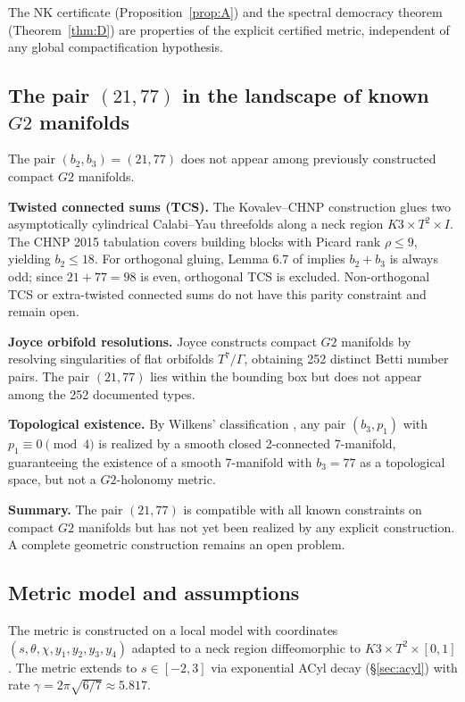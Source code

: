 \documentclass[11pt,a4paper]{article}
\theoremstyle{definition}
\theoremstyle{remark}
\newcommand{\Gtwo}{\mathrm{G}_2}
\def\Gtwo{G2}%
\begin{document}
The NK certificate (Proposition~\ref{prop:A}) and the spectral democracy theorem (Theorem~\ref{thm:D}) are properties of the explicit certified metric, independent of any global compactification hypothesis.

\subsection{The pair $(21, 77)$ in the landscape of known $\Gtwo$ manifolds}

The pair $(b_2, b_3) = (21, 77)$ does not appear among previously constructed compact $\Gtwo$ manifolds.

\textbf{Twisted connected sums (TCS).} The Kovalev--CHNP construction \cite{Kovalev2003,CHNP2015} glues two asymptotically cylindrical Calabi--Yau threefolds along a neck region $K3 \times T^2 \times I$. The CHNP 2015 tabulation covers building blocks with Picard rank $\rho \leq 9$, yielding $b_2 \leq 18$. For orthogonal gluing, Lemma 6.7 of \cite{CHNP2015} implies $b_2 + b_3$ is always odd; since $21 + 77 = 98$ is even, orthogonal TCS is excluded. Non-orthogonal TCS or extra-twisted connected sums \cite{Nordstrom2023} do not have this parity constraint and remain open.

\textbf{Joyce orbifold resolutions.} Joyce \cite{Joyce2000} constructs compact $\Gtwo$ manifolds by resolving singularities of flat orbifolds $T^7/\Gamma$, obtaining 252 distinct Betti number pairs. The pair $(21, 77)$ lies within the bounding box but does not appear among the 252 documented types.

\textbf{Topological existence.} By Wilkens' classification \cite{Wilkens1972}, any pair $(b_3, p_1)$ with $p_1 \equiv 0 \pmod{4}$ is realized by a smooth closed 2-connected 7-manifold, guaranteeing the existence of a smooth 7-manifold with $b_3 = 77$ as a topological space, but not a $\Gtwo$-holonomy metric.

\textbf{Summary.} The pair $(21, 77)$ is compatible with all known constraints on compact $\Gtwo$ manifolds but has not yet been realized by any explicit construction. A complete geometric construction remains an open problem.

\subsection{Metric model and assumptions}

The metric is constructed on a local model with coordinates $(s, \theta, \chi, y_1, y_2, y_3, y_4)$ adapted to a neck region diffeomorphic to $K3 \times T^2 \times [0, 1]$. The metric extends to $s \in [-2, 3]$ via exponential ACyl decay (§\ref{sec:acyl}) with rate $\gamma = 2\pi\sqrt{6/7} \approx 5.817$.
\end{document}
